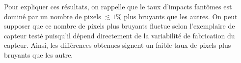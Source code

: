    
   Pour expliquer ces r\'esultats, on rappelle que le taux d'impacts fant\^omes est domin\'e par un nombre de pixels $\lesssim 1\%$ plus bruyants que les autres. On peut supposer que ce nombre de pixels plus bruyants fluctue selon l'exemplaire de capteur test\'e puisqu'il d\'epend directement de la variabilit\'e de fabrication du capteur. Ainsi, les diff\'erences obtenues signent un faible taux de pixels plus bruyants que les autre.
   
   \FloatBarrier
   
%    
   
   
   
